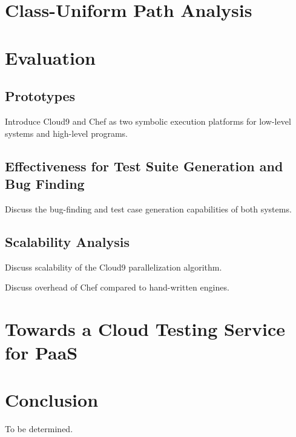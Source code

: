 \documentclass[letterpaper,10pt,oneside]{book}
\begin{document}
\chapter{Class-Uniform Path Analysis}
\label{ch:cupa}



\chapter{Evaluation}
\label{ch:evaluation}


\section{Prototypes}

Introduce Cloud9 and Chef as two symbolic execution platforms for low-level systems and high-level programs.

\section{Effectiveness for Test Suite Generation and Bug Finding}

Discuss the bug-finding and test case generation capabilities of both systems.

\section{Scalability Analysis}

Discuss scalability of the Cloud9 parallelization algorithm.

Discuss overhead of Chef compared to hand-written engines.


\chapter{Towards a Cloud Testing Service for PaaS}
\label{ch:paas}



\chapter{Conclusion}
\label{ch:conclusion}

To be determined.



\end{document}
